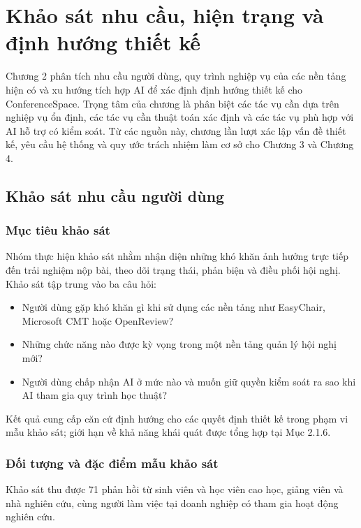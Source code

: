 \chapter{Khảo sát nhu cầu, hiện trạng và định hướng thiết kế}
\label{Chapter2}

Chương 2 phân tích nhu cầu người dùng, quy trình nghiệp vụ của các nền tảng hiện có và xu hướng tích hợp AI để xác định định hướng thiết kế cho ConferenceSpace. Trọng tâm của chương là phân biệt các tác vụ cần dựa trên nghiệp vụ ổn định, các tác vụ cần thuật toán xác định và các tác vụ phù hợp với AI hỗ trợ có kiểm soát. Từ các nguồn này, chương lần lượt xác lập vấn đề thiết kế, yêu cầu hệ thống và quy ước trách nhiệm làm cơ sở cho Chương 3 và Chương 4.

\section{Khảo sát nhu cầu người dùng}

\subsection{Mục tiêu khảo sát}

Nhóm thực hiện khảo sát nhằm nhận diện những khó khăn ảnh hưởng trực tiếp đến trải nghiệm nộp bài, theo dõi trạng thái, phản biện và điều phối hội nghị. Khảo sát tập trung vào ba câu hỏi:

\begin{itemize}
    \item Người dùng gặp khó khăn gì khi sử dụng các nền tảng như EasyChair, Microsoft CMT hoặc OpenReview?
    \item Những chức năng nào được kỳ vọng trong một nền tảng quản lý hội nghị mới?
    \item Người dùng chấp nhận AI ở mức nào và muốn giữ quyền kiểm soát ra sao khi AI tham gia quy trình học thuật?
\end{itemize}

Kết quả cung cấp căn cứ định hướng cho các quyết định thiết kế trong phạm vi mẫu khảo sát; giới hạn về khả năng khái quát được tổng hợp tại Mục 2.1.6.

\subsection{Đối tượng và đặc điểm mẫu khảo sát}

Khảo sát thu được 71 phản hồi từ sinh viên và học viên cao học, giảng viên và nhà nghiên cứu, cùng người làm việc tại doanh nghiệp có tham gia hoạt động nghiên cứu.

